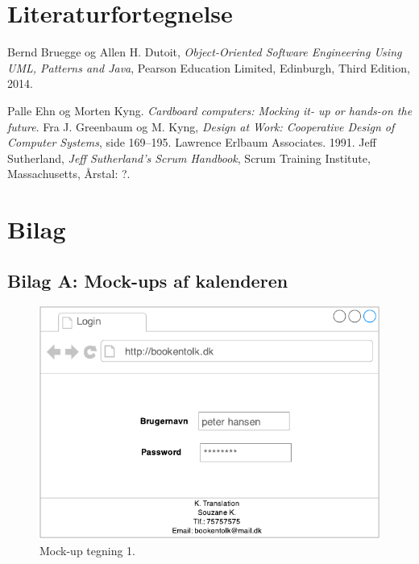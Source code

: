 \documentclass[12pt]{article}   %
\begin{document}
\pagebreak

\section{Literaturfortegnelse}
\begin{thebibliography}{9}
		Bernd Bruegge og Allen H. Dutoit,
		\emph{Object-Oriented Software Engineering Using UML, Patterns and Java},
		Pearson Education Limited, Edinburgh,
		Third Edition,
		2014.
		
	Palle Ehn og Morten Kyng. \emph{Cardboard computers: Mocking it- up or hands-on the future}.
	Fra J. Greenbaum og M. Kyng, \emph{Design at Work:
	Cooperative Design of Computer Systems}, side 169–195. Lawrence Erlbaum Associates. 1991.
		Jeff Sutherland,
		\emph{Jeff Sutherland's Scrum Handbook},
		Scrum Training Institute, Massachusetts,
		Årstal: ?.


\end{thebibliography}

\newpage

\section{Bilag}

\subsection{Bilag A: Mock-ups af kalenderen}

\begin{figure}[!ht]
\begin{center}
\includegraphics{mock1.pdf}
\caption{Mock-up tegning 1.}
\end{center}
\end{figure}
\end{document}
